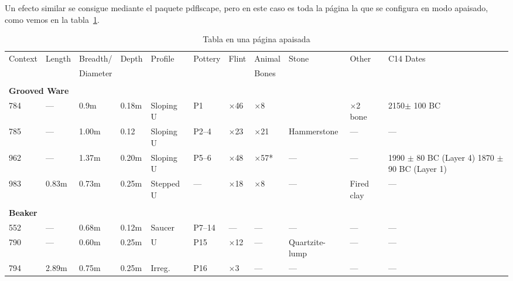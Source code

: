 \documentclass[11pt,a4paper]{article}
\begin{document}
\begin{landscape}
Un efecto similar se consigue mediante el paquete pdflscape, pero en este caso es toda la página la que se configura en modo apaisado, como vemos en la tabla~\ref{tab:apaisada}. 

\begin{table}[H]
	\centering
	\caption[Ejemplo de tabla apaisada]{Tabla en una página apaisada}\label{tab:apaisada}
	\begin{tabular}{llllllllp{1in}lp{1in}}
		\toprule
		Context   &Length   &Breadth/   &Depth   &Profile   &Pottery   &Flint   &Animal   &Stone   &Other    &C14 Dates \\
		&         &Diameter   &        &          &          &        & 
		Bones&&&\\
		\midrule
		&&&&&&&&&&\\
		\multicolumn{10}{l}{\bf Grooved Ware}&\\
		784       &---        &0.9m       &0.18m   &Sloping U &P1       &$\times$46  &  $\times$8      &&       $\times$2 bone&  2150$\pm$ 100 BC\\
		785       &---        &1.00m      &0.12    &Sloping U &P2--4    &$\times$23  &  $\times$21     & Hammerstone &---&---\\
		962       &---        &1.37m      &0.20m   &Sloping U &P5--6    &$\times$48  &  $\times$57*    & ---&     ---&1990 $\pm$ 80 BC (Layer 4) 1870 $\pm$90 BC (Layer 1)\\
		983       &0.83m      &0.73m      &0.25m   &Stepped U &---      &$\times$18  &  $\times$8      & ---& Fired clay&---\\
		&&&&&&&&&&\\
		\multicolumn{10}{l}{\bf Beaker}&\\
		552       &---        &0.68m      &0.12m   &Saucer    &P7--14   &---           & ---       & ---       &---        &---\\
		790       &---        &0.60m      &0.25m   &U         &P15      &$\times$12    & ---       & Quartzite-lump&---    &---\\
		794       &2.89m      &0.75m      &0.25m   &Irreg.    &P16      &$\times$3     & ---       & ---       &---        &---\\
		\bottomrule
	\end{tabular}
\end{table}
\end{landscape}
\end{document}
